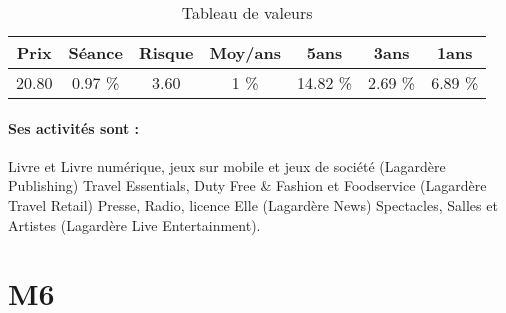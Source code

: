 \documentclass[11pt,a4paper]{report}%
\begin{document}
\begin{table}[H]
  \centering
    \begin{tabular}{|c|c|c|c|c|c|c|}
    \hline
    Prix & Séance & Risque  & Moy/ans & 5ans & 3ans & 1ans \\
    \hline
    20.80 &    0.97 \%    & 3.60 & 1 \% & 14.82 \% & 2.69 \% & 6.89 \% \\
    \hline
    \end{tabular}%
        \label{tab:table_LAGARDERE}%
      \caption{Tableau de valeurs}
\end{table}%

\paragraph{Ses activités sont : } Livre et Livre numérique, jeux sur mobile et jeux de société (Lagardère Publishing) Travel Essentials, Duty Free \& Fashion et Foodservice (Lagardère Travel Retail) Presse, Radio, licence Elle (Lagardère News) Spectacles, Salles et Artistes (Lagardère Live Entertainment). 
    
    \newpage

\section{M6}
\end{document}
